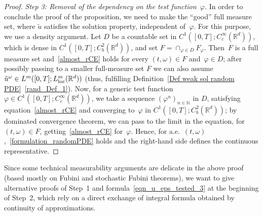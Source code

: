 \documentclass[a4paper,10pt]{article}
\newcommand\1{\mathbbm{1}}
\newcommand{\mr}{\mathbb{R}}
\newcommand{\td}{\tilde}
\newcommand\loc{{\rm loc}}
\numberwithin{equation}{section}
\begin{document}
\begin{proof}
{\emph{Step 3: Removal of the dependency on the test function~$\varphi$.}} In order to conclude the proof of the proposition, we need to make the ``good'' full measure set, where $\td{u}$ satisfies the solution property, independent of~$\varphi$. For this purpose, we use a density argument. Let $D$ be a countable set in $C^1([0,T];C^\infty_c(\mr^d))$, which is dense in $C^1([0,T]; C^2_b(\mr^d))$, and set $F=\cap_{\varphi\in D}F_\varphi$. Then~$F$ is a full measure set and~\eqref{almost_rCE} holds for every $(t,\omega) \in F$ and~$\varphi \in D$; after possibly passing to a smaller full-measure set $F$ we can also assume $\td{u}^\omega \in L^m([0,T];L^m_\loc(\mr^d))$ (thus, fulfilling Definition~\ref{Def weak sol random PDE}~\ref{rand_Def_1}). Now, for a generic test function~$\varphi \in C^1([0,T];C^\infty_c(\mr^d))$, we take a sequence $(\varphi^n)_{n \in \mathbb{N}}$ in $D$, satisfying equation~\eqref{almost_rCE} and converging to~$\varphi$ in $C^1([0,T]; C^2_b(\mr^d))$; by dominated convergence theorem, we can pass to the limit in the equation, for $(t,\omega) \in F$, getting~\eqref{almost_rCE} for~$\varphi$. Hence, for a.e.~$(t,\omega)$,~\eqref{formulation_randomPDE} holds and the right-hand side defines the continuous representative.
\end{proof}

Since some technical measurability arguments are delicate in the above proof (based mostly on Fubini and stochastic Fubini theorems), we want to give alternative proofs of Step~1 and formula~\eqref{eqn_u_eps_tested_3} at the beginning of Step~2, which rely on a direct exchange of integral formula obtained by continuity of approximations.
\end{document}
